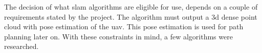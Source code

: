 The decision of what \acs{slam} algorithms are eligible for use, depends on a couple of requirements stated by the project. The algorithm must output a \acs{3d} dense point cloud with pose estimation of the \acs{uav}. This pose estimation is used for path planning later on. With these constraints in mind, a few algorithms were researched.